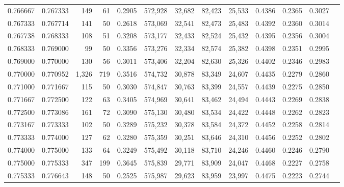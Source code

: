 \begin{tabular}{rrrrrrrrrrrrr}
0.766667 & 0.767333 &   149 &  61 &                                     0.2905 & 572,928 &  32,682 &  82,423 &  25,533 & 0.4386 & 0.2365 & 0.3027 \\
0.767333 & 0.767714 &   141 &  50 &                                     0.2618 & 573,069 &  32,541 &  82,473 &  25,483 & 0.4392 & 0.2360 & 0.3014 \\
0.767738 & 0.768333 &   108 &  51 &                                     0.3208 & 573,177 &  32,433 &  82,524 &  25,432 & 0.4395 & 0.2356 & 0.3004 \\
0.768333 & 0.769000 &    99 &  50 &                                     0.3356 & 573,276 &  32,334 &  82,574 &  25,382 & 0.4398 & 0.2351 & 0.2995 \\
0.769000 & 0.770000 &   130 &  56 &                                     0.3011 & 573,406 &  32,204 &  82,630 &  25,326 & 0.4402 & 0.2346 & 0.2983 \\
0.770000 & 0.770952 & 1,326 & 719 &                                     0.3516 & 574,732 &  30,878 &  83,349 &  24,607 & 0.4435 & 0.2279 & 0.2860 \\
0.771000 & 0.771667 &   115 &  50 &                                     0.3030 & 574,847 &  30,763 &  83,399 &  24,557 & 0.4439 & 0.2275 & 0.2850 \\
0.771667 & 0.772500 &   122 &  63 &                                     0.3405 & 574,969 &  30,641 &  83,462 &  24,494 & 0.4443 & 0.2269 & 0.2838 \\
0.772500 & 0.773086 &   161 &  72 &                                     0.3090 & 575,130 &  30,480 &  83,534 &  24,422 & 0.4448 & 0.2262 & 0.2823 \\
0.773167 & 0.773333 &   102 &  50 &                                     0.3289 & 575,232 &  30,378 &  83,584 &  24,372 & 0.4452 & 0.2258 & 0.2814 \\
0.773333 & 0.774000 &   127 &  62 &                                     0.3280 & 575,359 &  30,251 &  83,646 &  24,310 & 0.4456 & 0.2252 & 0.2802 \\
0.774000 & 0.775000 &   133 &  64 &                                     0.3249 & 575,492 &  30,118 &  83,710 &  24,246 & 0.4460 & 0.2246 & 0.2790 \\
0.775000 & 0.775333 &   347 & 199 &                                     0.3645 & 575,839 &  29,771 &  83,909 &  24,047 & 0.4468 & 0.2227 & 0.2758 \\
0.775333 & 0.776643 &   148 &  50 &                                     0.2525 & 575,987 &  29,623 &  83,959 &  23,997 & 0.4475 & 0.2223 & 0.2744 \\

\end{tabular}
